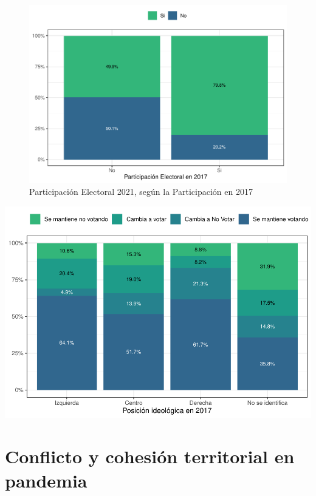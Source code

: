 \documentclass[
  12pt,
]{book}
\begin{document}
\begin{figure}

{\centering \includegraphics{reporte-elsoc_files/figure-latex/2020-vs-2021-1} 

}

\caption{Participación Electoral 2021, según la Participación en 2017}\label{fig:2020-vs-2021}
\end{figure}

\includegraphics{reporte-elsoc_files/figure-latex/cambio_participa-1.pdf}

\hypertarget{conflicto-y-cohesiuxf3n-territorial-en-pandemia}{%
\chapter{Conflicto y cohesión territorial en pandemia}\label{conflicto-y-cohesiuxf3n-territorial-en-pandemia}}
\end{document}
